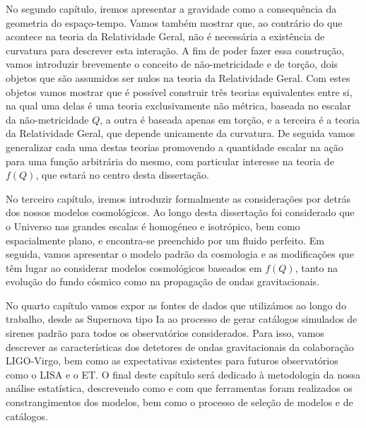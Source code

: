 No segundo capítulo, iremos apresentar a gravidade como a consequência da geometria do espaço-tempo. Vamos também mostrar que, ao contrário do que acontece na teoria da Relatividade Geral, não é necessária a existência de curvatura para descrever esta interação. A fim de poder fazer essa construção, vamos introduzir brevemente o conceito de não-metricidade e de torção, dois objetos que são assumidos ser nulos na teoria da Relatividade Geral. Com estes objetos vamos mostrar que é possível construir três teorias equivalentes entre si, na qual uma delas é uma teoria exclusivamente não métrica, baseada no escalar da não-metricidade $Q$, a outra é baseada apenas em torção, e a terceira é a teoria da Relatividade Geral, que depende unicamente da curvatura. De seguida vamos generalizar cada uma destas teorias promovendo a quantidade escalar na ação para uma função arbitrária do mesmo, com particular interesse na teoria de $f(Q)$, que estará no centro desta dissertação.

No terceiro capítulo, iremos introduzir formalmente as considerações por detrás dos nossos modelos cosmológicos. Ao longo desta dissertação foi considerado que o Universo nas grandes escalas é homogéneo e isotrópico, bem como espacialmente plano, e encontra-se preenchido por um fluido perfeito. Em seguida, vamos apresentar o modelo padrão da cosmologia e as modificações que têm lugar ao considerar modelos cosmológicos baseados em $f(Q)$, tanto na evolução do fundo cósmico como na propagação de ondas gravitacionais.

No quarto capítulo vamos expor as fontes de dados que utilizámos ao longo do trabalho, desde as Supernova tipo Ia ao processo de gerar catálogos simulados de sirenes padrão para todos os observatórios considerados. Para isso, vamos descrever as características dos detetores de ondas gravitacionais da colaboração \gls{LIGO}-Virgo, bem como as expectativas existentes para futuros observatórios como o \gls{LISA} e o \gls{ET}. O final deste capítulo será dedicado à metodologia da nossa análise estatística, descrevendo como e com que ferramentas foram realizados os constrangimentos dos modelos, bem como o processo de seleção de modelos e de catálogos.

